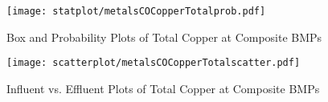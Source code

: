         \begin{figure}[hb]   %
            \centering
            \texttt{[image: statplot/metalsCOCopperTotalprob.pdf]}
            \caption{Box and Probability Plots of Total Copper at Composite BMPs}
        \end{figure}         %
        
        
        \begin{figure}[hb]   %
            \centering
            \texttt{[image: scatterplot/metalsCOCopperTotalscatter.pdf]}
            \caption{Influent vs. Effluent Plots of Total Copper at Composite BMPs}
        \end{figure}         %
        \clearpage
        